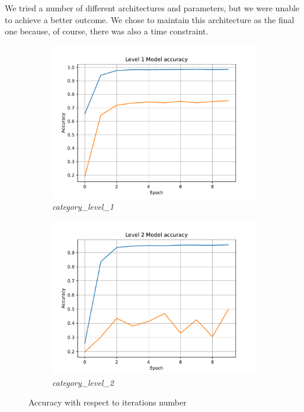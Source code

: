 We tried a number of different architectures and parameters, but we were unable to achieve a better outcome. We chose to maintain this architecture as the final one because, of course, there was also a time constraint.



\begin{figure}[htpb]
	\centering
	\begin{subfigure}{0.48\linewidth}
		\centering
		\includegraphics[width=\linewidth]{Images/level_1_epoch_accuracy.pdf}
		\caption{\textit{category\_level\_1}}
		\label{fig:epoch_vs_accuracy_level_1}
	\end{subfigure}
	\begin{subfigure}{0.48\linewidth}
		\centering
		\includegraphics[width=\linewidth]{Images/level_2_epoch_accuracy.pdf}
		\caption{\textit{category\_level\_2}}
		\label{fig:epoch_vs_accuracy_level_2}
	\end{subfigure}
	\caption{Accuracy with respect to iterations number}
	\label{fig:epocs_vs_accuracy}
\end{figure}

